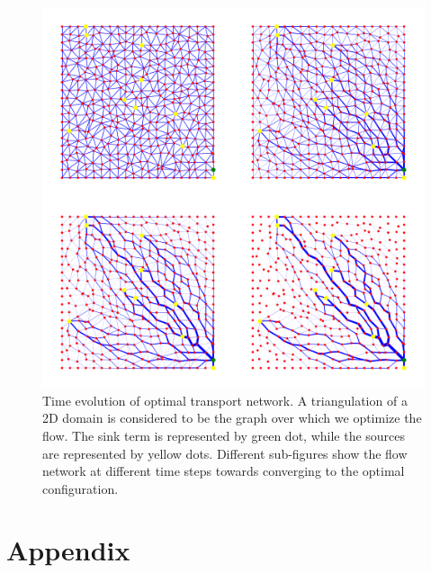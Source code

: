 \documentclass[10pt,a4paper,twocolumn]{article}
\begin{document}
	\begin{figure}[h!]
		\centering
		\includegraphics[width=1\linewidth]{images/evolution}
		\caption{Time evolution of optimal transport network. A triangulation of a 2D domain is considered to be the graph over which we optimize the flow. The sink term is represented by green dot, while the sources are represented by yellow dots. Different sub-figures show the flow network at different time steps towards converging to the optimal configuration.}
		\label{fig:GraphEvolution}
	\end{figure}
	
	
	
	 
	
	\appendix
	\clearpage
	\section{Appendix}
	\label{appndix}
	
\end{document}
